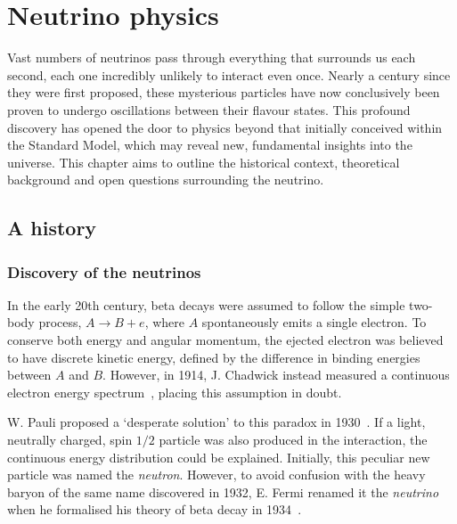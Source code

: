 \chapter{Neutrino physics} %
\label{chap:theory} %

Vast numbers of neutrinos pass through everything that surrounds us each second, each one
incredibly unlikely to interact even once. Nearly a century since they were first proposed, these
mysterious particles have now conclusively been proven to undergo oscillations between their
flavour states. This profound discovery has opened the door to physics beyond that initially
conceived within the Standard Model, which may reveal new, fundamental insights into the universe.
This chapter aims to outline the historical context, theoretical background and open questions
surrounding the neutrino.

\section{A history} %
\label{sec:theory_history} %

\subsection{Discovery of the neutrinos} %
\label{sec:theory_history_neutrinos} %

In the early 20th century, beta decays were assumed to follow the simple two-body process,
$A\rightarrow B + e$, where $A$ spontaneously emits a single electron. To conserve both energy and
angular momentum, the ejected electron was believed to have discrete kinetic energy, defined by
the difference in binding energies between $A$ and $B$. However, in 1914, J. Chadwick instead
measured a continuous electron energy spectrum~\cite{chadwick1914}, placing this assumption in
doubt.

W. Pauli proposed a `desperate solution' to this paradox in 1930~\cite{pauli1930}. If a light,
neutrally charged, spin $1/2$ particle was also produced in the interaction, the continuous energy
distribution could be explained. Initially, this peculiar new particle was named the
\emph{neutron}. However, to avoid confusion with the heavy baryon of the same name discovered in
1932, E. Fermi renamed it the \emph{neutrino} when he formalised his theory of beta decay in
1934~\cite{fermi1934}.

